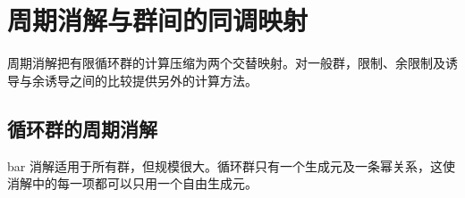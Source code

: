 
\section{周期消解与群间的同调映射}
\label{b4:sec:1103}

周期消解把有限循环群的计算压缩为两个交替映射。对一般群，限制、余限制及诱导与余诱导之间的比较提供另外的计算方法。

%
%

\subsection{循环群的周期消解}
\label{b4:subsec:1103:01}

bar 消解适用于所有群，但规模很大。循环群只有一个生成元及一条幂关系，这使消解中的每一项都可以只用一个自由生成元。


